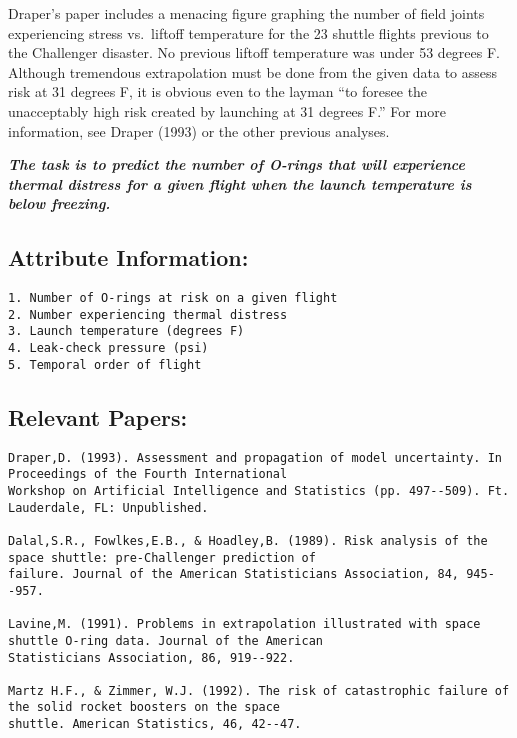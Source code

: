 \documentclass[11pt]{article}
\begin{document}
Draper's paper includes a menacing figure graphing the number of field
joints experiencing stress vs.~liftoff temperature for the 23 shuttle
flights previous to the Challenger disaster. No previous liftoff
temperature was under 53 degrees F. Although tremendous extrapolation
must be done from the given data to assess risk at 31 degrees F, it is
obvious even to the layman ``to foresee the unacceptably high risk
created by launching at 31 degrees F.'' For more information, see Draper
(1993) or the other previous analyses.

\textbf{\emph{The task is to predict the number of O-rings that will
experience thermal distress for a given flight when the launch
temperature is below freezing.}}

\hypertarget{attribute-information}{%
\subsection{Attribute Information:}\label{attribute-information}}

\begin{verbatim}
1. Number of O-rings at risk on a given flight
2. Number experiencing thermal distress
3. Launch temperature (degrees F)
4. Leak-check pressure (psi)
5. Temporal order of flight
\end{verbatim}

\hypertarget{relevant-papers}{%
\subsection{Relevant Papers:}\label{relevant-papers}}

\begin{verbatim}
Draper,D. (1993). Assessment and propagation of model uncertainty. In Proceedings of the Fourth International
Workshop on Artificial Intelligence and Statistics (pp. 497--509). Ft. Lauderdale, FL: Unpublished.

Dalal,S.R., Fowlkes,E.B., & Hoadley,B. (1989). Risk analysis of the space shuttle: pre-Challenger prediction of
failure. Journal of the American Statisticians Association, 84, 945--957.

Lavine,M. (1991). Problems in extrapolation illustrated with space shuttle O-ring data. Journal of the American
Statisticians Association, 86, 919--922.

Martz H.F., & Zimmer, W.J. (1992). The risk of catastrophic failure of the solid rocket boosters on the space
shuttle. American Statistics, 46, 42--47.
\end{verbatim}
\end{document}
